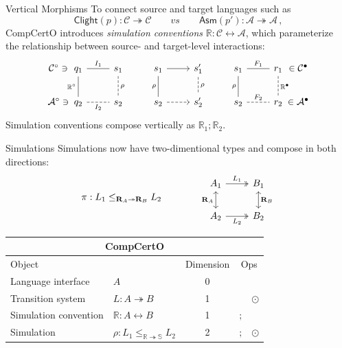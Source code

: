 \documentclass[aspectratio=1610,12pt]{beamer}
\begin{document}
\begin{frame}[fragile]{Vertical Morphisms} %
  To connect source and target languages such as
  \[
    \mathsf{Clight}(p) : \mathcal{C} \twoheadrightarrow \mathcal{C}
    \qquad
    \textit{vs}
    \qquad
    \mathsf{Asm}(p') : \mathcal{A} \twoheadrightarrow \mathcal{A}
    \,,
  \]
  CompCertO introduces \emph{simulation conventions}
  $\mathbb{R} : \mathcal{C} \leftrightarrow \mathcal{A}$,
  which parameterize \\
  the relationship between source- and target-level interactions:
  \[
    \begin{tikzcd}
      \mathcal{C}^\circ \ni {} \hspace{-3em} &
      q_1 \ar[r, dash, "I_1"] \ar[d, "\mathbb{R}^\circ"', dash] & s_1 \ar[d, "\rho", dash, dashed] &
      s_1 \ar[r] \ar[d, dash, "\rho"'] & s_1' \ar[d, dashed, dash, "\rho"] &
      s_1 \ar[r, dash, "F_1"] \ar[d, dash, "\rho"'] & r_1 \ar[d, "\mathbb{R}^\bullet", dashed, dash]
      & \hspace{-3em} {} \in \mathcal{C}^\bullet
      \\
      \mathcal{A}^\circ \ni {} \hspace{-3em} &
      q_2 \ar[r, dash, dashed, "I_2"'] & s_2 &
      s_2 \ar[r, dashed] & s_2' & s_2 \ar[r, dashed, dash, "F_2"] & r_2
      & \hspace{-3em} {} \in \mathcal{A}^\bullet
    \end{tikzcd}
  \]
  Simulation conventions compose vertically as $\mathbb{R}_1 \mathbin; \mathbb{R}_2$.
\end{frame}

\begin{frame}[fragile]{Simulations} %
  Simulations now have two-dimentional types and compose in both directions:
\[
  \pi : L_1 \le_{\mathbf{R}_A \twoheadrightarrow \mathbf{R}_B} L_2
  \qquad
  \qquad
  \begin{tikzcd}
    A_1 \ar[d, leftrightarrow, "\mathbf{R}_A"']
        \ar[r, twoheadrightarrow, "L_1"] &
    B_1 \ar[d, leftrightarrow, "\mathbf{R}_B"] \\
    A_2 \ar[r, twoheadrightarrow, "L_2"'] &
    B_2
  \end{tikzcd}
\]

  \pause
  \begin{center}
    \begin{tabular}{llcll}
      \toprule
      \multicolumn{5}{c}{\textbf{CompCertO}} \\
      \midrule
      Object & & Dimension & \multicolumn{2}{c}{Ops} \\
      \midrule
      Language interface & $A$ & 0 & \\
      Transition system & $L : A \twoheadrightarrow B$ & 1 & & $\odot$ \\
      Simulation convention & $\mathbb{R} : A \leftrightarrow B$ & 1 & $\mathbin;$ \\
      Simulation & $\rho : L_1 \le_\mathbb{R \twoheadrightarrow S} L_2$ & 2 & $\mathbin;$ & $\odot$ \\
      \bottomrule
    \end{tabular}
  \end{center}
\end{frame}
\end{document}
